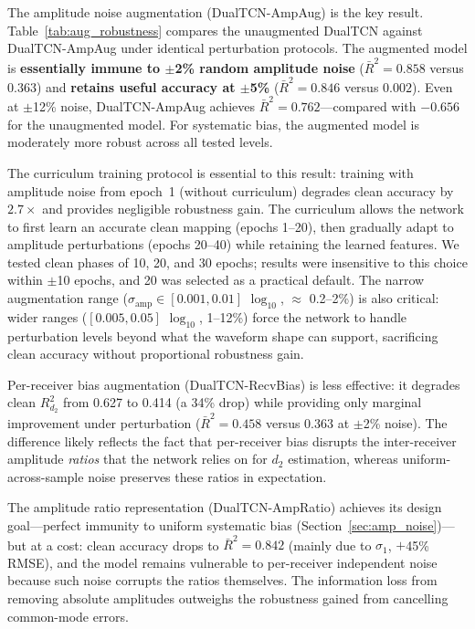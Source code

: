 \documentclass[journal]{IEEEtran}
\begin{document}

The amplitude noise augmentation (DualTCN-AmpAug) is the key result.
Table~\ref{tab:aug_robustness} compares the unaugmented DualTCN
against DualTCN-AmpAug under identical perturbation protocols.  The
augmented model is \textbf{essentially immune to $\pm$2\% random
amplitude noise} ($\bar{R}^2 = 0.858$ versus $0.363$) and
\textbf{retains useful accuracy at $\pm$5\%} ($\bar{R}^2 = 0.846$
versus $0.002$).  Even at $\pm$12\% noise, DualTCN-AmpAug achieves
$\bar{R}^2 = 0.762$---compared with $-0.656$ for the unaugmented
model.  For systematic bias, the augmented model is moderately more
robust across all tested levels.

The curriculum training protocol is essential to this result:
training with amplitude noise from epoch~1 (without curriculum)
degrades clean accuracy by $2.7\times$ and provides negligible
robustness gain.  The curriculum allows the network to first learn an
accurate clean mapping (epochs 1--20), then gradually adapt to
amplitude perturbations (epochs 20--40) while retaining the learned
features.  We tested clean phases of 10, 20, and 30 epochs; results
were insensitive to this choice within $\pm$10 epochs, and 20 was
selected as a practical default.  The narrow augmentation range
($\sigma_\mathrm{amp} \in [0.001, 0.01]$ $\log_{10}$, $\approx$
0.2--2\%) is also critical: wider ranges
($[0.005, 0.05]$ $\log_{10}$, 1--12\%) force the network to handle
perturbation levels beyond what the waveform shape can support,
sacrificing clean accuracy without proportional robustness gain.

Per-receiver bias augmentation (DualTCN-RecvBias) is less
effective: it degrades clean $R^2_{d_2}$ from 0.627 to 0.414 (a 34\%
drop) while providing only marginal improvement under perturbation
($\bar{R}^2 = 0.458$ versus $0.363$ at $\pm$2\% noise).  The
difference likely reflects the fact that per-receiver bias disrupts
the inter-receiver amplitude \emph{ratios} that the network relies on
for $d_2$ estimation, whereas uniform-across-sample noise preserves
these ratios in expectation.

The amplitude ratio representation (DualTCN-AmpRatio) achieves its
design goal---perfect immunity to uniform systematic bias
(Section~\ref{sec:amp_noise})---but at a cost: clean accuracy drops
to $\bar{R}^2 = 0.842$ (mainly due to $\sigma_1$, $+$45\% RMSE),
and the model remains vulnerable to per-receiver independent noise
because such noise corrupts the ratios themselves.  The information
loss from removing absolute amplitudes outweighs the robustness
gained from cancelling common-mode errors.
\end{document}
